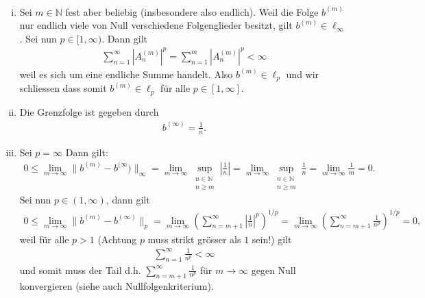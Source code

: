 \documentclass[a4paper, 20]{exam}
\begin{document}
\begin{solution} \
\begin{enumerate}[i)]
\item Sei $m \in \mathbb{N}$ fest aber beliebig (insbesondere also endlich). Weil die Folge $b^{(m)}$ nur endlich viele von Null verschiedene Folgenglieder besitzt, gilt $b^{(m)} \in \ell_\infty$. Sei nun $p \in [1, \infty)$. Dann gilt
\begin{align*}
\sum_{n=1}^\infty |A_n^{(m)}|^p = \sum_{n=1}^m |A_n^{(m)}|^p < \infty
\end{align*}
weil es sich um eine endliche Summe handelt. Also $b^{(m)} \in \ell_p$ und wir schliessen dass somit $b^{(m)} \in \ell_p$ für alle $p \in [1, \infty]$. 
\item Die Grenzfolge ist gegeben durch 
\begin{align*}
b^{( \infty)} = \frac{1}{n}.
\end{align*}
\item Sei $p = \infty$ Dann gilt:
\begin{align*}
0 \leq \lim_{m \to \infty} \|b^{(m)} - b^{(\infty})\|_\infty = \lim_{m \to \infty} \sup_{\substack{n \in \mathbb{N} \\ n \geq m}} \left| \frac{1}{n}\right| = \lim_{m \to \infty} \sup_{\substack{n \in \mathbb{N} \\ n \geq m}}  \frac{1}{n} = \lim_{m \to \infty} \frac{1}{m} = 0. 
\end{align*}
Sei nun $p \in (1, \infty)$, dann gilt 
\begin{align*}
0 \leq \lim_{m \to \infty} \|b^{(m)}- b^{( \infty)} \|_p = \lim_{m \to \infty} \left( \sum_{n=m+1}^\infty \left| \frac{1}{n}\right|^p \right)^{1/p} =\lim_{m \to \infty} \left( \sum_{n=m+1}^\infty  \frac{1}{n^p} \right)^{1/p}= 0,
\end{align*}
weil für alle $p > 1$ (Achtung $p$ muss strikt grösser als $1$ sein!) gilt
\begin{align*}
\sum_{n=1}^\infty \frac{1}{n^p}< \infty
\end{align*}
und somit muss der Tail d.h. $\sum_{n=m+1}^\infty \frac{1}{n^p}$ für $m \to \infty$  gegen Null konvergieren (siehe auch Nullfolgenkriterium). 
\end{enumerate}
\end{solution}
\end{document}

